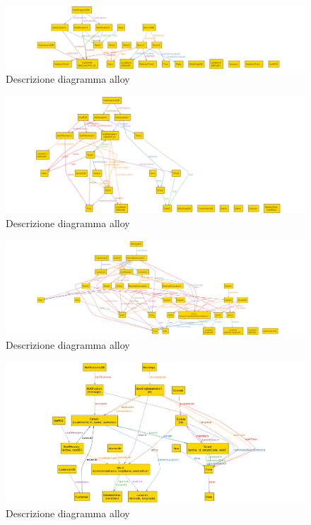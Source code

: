 \begin{figure} [H]
	\includegraphics[width=\linewidth]{../Alloy/isCustomer.png}
	\caption{Descrizione diagramma alloy}
	\label{fig:AlloyTag6}
\end{figure}

\begin{figure} [H]
	\includegraphics[width=\linewidth]{../Alloy/isStaff.png}
	\caption{Descrizione diagramma alloy}
	\label{fig:AlloyTag7}
\end{figure}

\begin{figure} [H]
	\includegraphics[width=\linewidth]{../Alloy/maxOccupantsNotExceeded.png}
	\caption{Descrizione diagramma alloy}
	\label{fig:AlloyTag8}
\end{figure}

\begin{figure} [H]
	\includegraphics[width=\linewidth]{../Alloy/metamodel.png}
	\caption{Descrizione diagramma alloy}
	\label{fig:AlloyTag9}
\end{figure}

